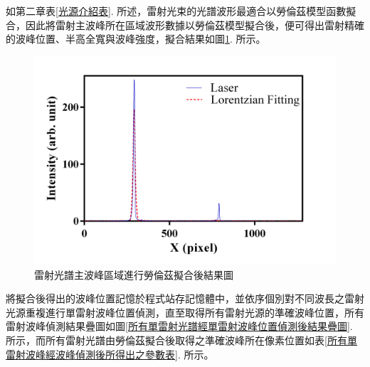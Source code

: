 \newpage
如第二章表\ref{光源介紹表}. 所述，雷射光束的光譜波形最適合以勞倫茲模型函數擬合，因此將雷射主波峰所在區域波形數據以勞倫茲模型擬合後，便可得出雷射精確的波峰位置、半高全寬與波峰強度，擬合結果如圖\ref{雷射光譜主波峰區域進行勞倫茲擬合後結果圖}. 所示。
\begin{figure}[H] %
	\centering %
	\vspace{0.8cm}
	\setlength{\abovecaptionskip}{0.cm}
	\includegraphics[width=\textwidth]{figures/L1_Lorentz.png} %
	\caption{雷射光譜主波峰區域進行勞倫茲擬合後結果圖} %
	\label{雷射光譜主波峰區域進行勞倫茲擬合後結果圖} %
\end{figure}
將擬合後得出的波峰位置記憶於程式站存記憶體中，並依序個別對不同波長之雷射光源重複進行單雷射波峰位置偵測，直至取得所有雷射光源的準確波峰位置，所有雷射波峰偵測結果疊圖如圖\ref{所有單雷射光譜經單雷射波峰位置偵測後結果疊圖}. 所示，而所有雷射光譜由勞倫茲擬合後取得之準確波峰所在像素位置如表\ref{所有單雷射波峰經波峰偵測後所得出之參數表}. 所示。
